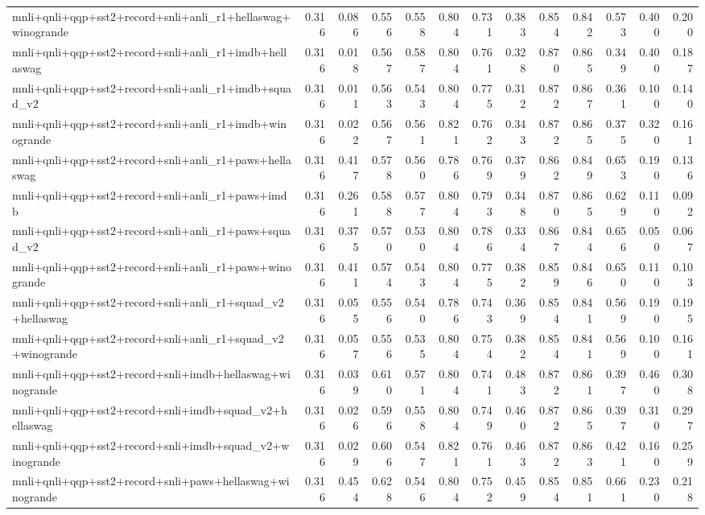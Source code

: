 \begin{table}[t]
\begin{tabular}{lrrrrrrrrrrrr}
    mnli+qnli+qqp+sst2+record+snli+anli\_r1+hellaswag+winogrande & 0.316 & 0.086 & 0.556 & 0.558 & 0.804 & 0.731 & 0.383 & 0.854 & 0.842 & 0.573 & 0.400 & 0.200 \\
    mnli+qnli+qqp+sst2+record+snli+anli\_r1+imdb+hellaswag & 0.316 & 0.018 & 0.567 & 0.587 & 0.804 & 0.761 & 0.328 & 0.870 & 0.865 & 0.349 & 0.400 & 0.187 \\
    mnli+qnli+qqp+sst2+record+snli+anli\_r1+imdb+squad\_v2 & 0.316 & 0.011 & 0.563 & 0.543 & 0.804 & 0.775 & 0.312 & 0.872 & 0.867 & 0.361 & 0.100 & 0.140 \\
    mnli+qnli+qqp+sst2+record+snli+anli\_r1+imdb+winogrande & 0.316 & 0.022 & 0.567 & 0.561 & 0.821 & 0.762 & 0.343 & 0.872 & 0.865 & 0.375 & 0.320 & 0.161 \\
    mnli+qnli+qqp+sst2+record+snli+anli\_r1+paws+hellaswag & 0.316 & 0.417 & 0.578 & 0.560 & 0.786 & 0.769 & 0.379 & 0.862 & 0.849 & 0.653 & 0.190 & 0.136 \\
    mnli+qnli+qqp+sst2+record+snli+anli\_r1+paws+imdb & 0.316 & 0.261 & 0.588 & 0.577 & 0.804 & 0.793 & 0.348 & 0.870 & 0.865 & 0.629 & 0.110 & 0.092 \\
    mnli+qnli+qqp+sst2+record+snli+anli\_r1+paws+squad\_v2 & 0.316 & 0.375 & 0.570 & 0.530 & 0.804 & 0.786 & 0.334 & 0.867 & 0.844 & 0.656 & 0.050 & 0.067 \\
    mnli+qnli+qqp+sst2+record+snli+anli\_r1+paws+winogrande & 0.316 & 0.411 & 0.574 & 0.543 & 0.804 & 0.775 & 0.382 & 0.859 & 0.846 & 0.650 & 0.110 & 0.103 \\
    mnli+qnli+qqp+sst2+record+snli+anli\_r1+squad\_v2+hellaswag & 0.316 & 0.055 & 0.556 & 0.540 & 0.786 & 0.743 & 0.369 & 0.854 & 0.841 & 0.569 & 0.190 & 0.195 \\
    mnli+qnli+qqp+sst2+record+snli+anli\_r1+squad\_v2+winogrande & 0.316 & 0.057 & 0.556 & 0.535 & 0.804 & 0.754 & 0.382 & 0.854 & 0.841 & 0.569 & 0.100 & 0.161 \\
    mnli+qnli+qqp+sst2+record+snli+imdb+hellaswag+winogrande & 0.316 & 0.039 & 0.610 & 0.571 & 0.804 & 0.741 & 0.483 & 0.872 & 0.861 & 0.397 & 0.460 & 0.308 \\
    mnli+qnli+qqp+sst2+record+snli+imdb+squad\_v2+hellaswag & 0.316 & 0.026 & 0.596 & 0.558 & 0.804 & 0.749 & 0.460 & 0.872 & 0.865 & 0.397 & 0.310 & 0.297 \\
    mnli+qnli+qqp+sst2+record+snli+imdb+squad\_v2+winogrande & 0.316 & 0.029 & 0.606 & 0.547 & 0.821 & 0.761 & 0.463 & 0.872 & 0.863 & 0.421 & 0.160 & 0.259 \\
    mnli+qnli+qqp+sst2+record+snli+paws+hellaswag+winogrande & 0.316 & 0.454 & 0.628 & 0.546 & 0.804 & 0.752 & 0.459 & 0.854 & 0.851 & 0.661 & 0.230 & 0.218 \\

\end{tabular}
\end{table}
